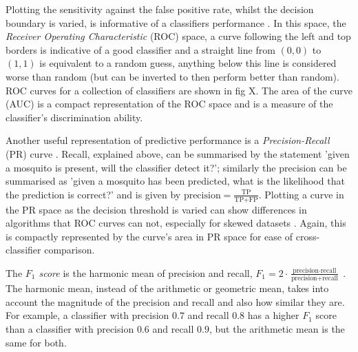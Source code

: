         \vspace{-1cm}
        Plotting the sensitivity against the false positive rate, whilst the decision boundary is varied, is informative of a classifiers performance \cite{Fawcett2005}. In this space, the \textit{Receiver Operating Characteristic} (ROC) space, a curve following the left and top borders is indicative of a good classifier and a straight line from $(0,0)$ to $(1,1)$ is equivalent to a random guess, anything below this line is considered worse than random (but can be inverted to then perform better than random). ROC curves for a collection of classifiers are shown in fig X. The area of the curve (AUC) is a compact representation of the ROC space and is a measure of the classifier's discrimination ability.
        
        Another useful representation of predictive performance is a \textit{Precision-Recall} (PR) curve \cite{Raghavan1989}. Recall, explained above, can be summarised by the statement 'given a mosquito is present, will the classifier detect it?'; similarly the precision can be summarised as 'given a mosquito has been predicted, what is the likelihood that the prediction is correct?' and is given by $\text{precision} = \frac{\text{TP}}{\text{TP+FP}}$. Plotting a curve in the PR space as the decision threshold is varied can show differences in algorithms that ROC curves can not, especially for skewed datasets \cite{Davis}. Again, this is compactly represented by the curve's area in PR space for ease of cross-classifier comparison.
        
        The \textit{$F_1$ score} is the harmonic mean of precision and recall, $F_1 = 2\cdot\frac{\text{precision}\cdot \text{recall}}{\text{precision}+\text{recall}}$ . The harmonic mean, instead of the arithmetic or geometric mean, takes into account the magnitude of the precision and recall and also how similar they are. For example, a classifier with precision $0.7$ and recall $0.8$ has a higher $F_1$ score than a classifier with precision $0.6$ and recall $0.9$, but the arithmetic mean is the same for both.
        
        
